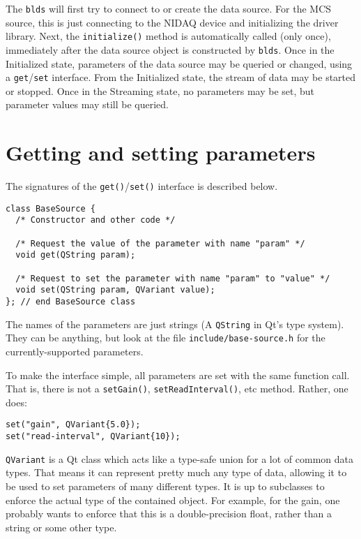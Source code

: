 \documentclass[12pt]{article}
\begin{document}
The \texttt{blds} will first try to connect to or create the data source. For the
MCS source, this is just connecting to the NIDAQ device and initializing the driver
library. Next, the \texttt{initialize()} method is automatically called 
(only once), immediately after the data
source object is constructed by \texttt{blds}. Once in the Initialized state, parameters
of the data source may be queried or changed, using a \texttt{get}/\texttt{set} interface.
From the Initialized state, the stream of data may be started or stopped. Once in the
Streaming state, no parameters may be set, but parameter values may still be queried.

\section*{Getting and setting parameters}

The signatures of the \texttt{get()}/\texttt{set()} interface is described below.

\begin{verbatim}
class BaseSource {
  /* Constructor and other code */

  /* Request the value of the parameter with name "param" */
  void get(QString param);

  /* Request to set the parameter with name "param" to "value" */
  void set(QString param, QVariant value);
}; // end BaseSource class
\end{verbatim}

The names of the parameters are just strings (A \texttt{QString} in Qt's type system).
They can be anything, but look at
the file \texttt{include/base-source.h} for the currently-supported parameters.

To make the interface simple, all parameters are set with the same function call.
That is, there is not a \texttt{setGain()}, \texttt{setReadInterval()}, etc method.
Rather, one does:

\begin{verbatim}
set("gain", QVariant{5.0});
set("read-interval", QVariant{10});
\end{verbatim}

\texttt{QVariant} is a Qt class which acts like a type-safe union for a lot of
common data types. That means it can represent pretty much any type of data,
allowing it to be used to set parameters of many different types. It is up to
subclasses to enforce the actual type of the contained object. For example,
for the gain, one probably wants to enforce that this is a double-precision
float, rather than a string or some other type.
\end{document}
